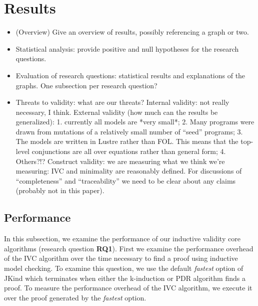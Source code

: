 \section{Results}

\newcommand{\takeaway}[1]{
\vspace{6pt}
\noindent\fbox{\parbox{\columnwidth}{#1}}
\vspace{6pt}
}

\begin{itemize}
    \item (Overview) Give an overview of results, possibly referencing a graph or two.
    \item Statistical analysis: provide positive and null hypotheses for the research questions.
    \item Evaluation of research questions: statistical results and explanations of the graphs.  One subsection per research question?
    \item Threats to validity: what are our threats?
    Internal validity: not really necessary, I think.
    External validity (how much can the results be generalized):
        1. currently all models are *very small*;
        2. Many programs were drawn from mutations of a relatively small number of ``seed'' programs;
        3. The models are written in Lustre rather than FOL.  This means that the
            top-level conjunctions are all over equations rather than general
            form;
        4. Others?!?
    Construct validity: we are measuring what we think we're measuring: IVC and minimality are reasonably defined.  For discussions of ``completeness'' and ``traceability'' we need to be clear about any claims (probably not in this paper).
\end{itemize}

\subsection{Performance}
\label{sec:performance}

In this subsection, we examine the performance of our inductive validity core algorithms (research question \textbf{RQ1}).  First we examine the performance overhead of the IVC algorithm over the time necessary to find a proof using inductive model checking.  To examine this question, we use the default {\em fastest} option of JKind which terminates when either the k-induction or PDR algorithm finds a proof.  To measure the performance overhead of the IVC algorithm, we execute it over the proof generated by the {\em fastest} option.  

